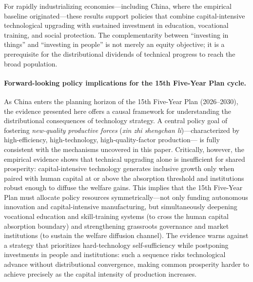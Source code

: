 \documentclass[12pt]{article}
\begin{document}
For rapidly industrializing economies---including China,
where the empirical baseline originated---these results
support policies that combine capital-intensive technological
upgrading with sustained investment in education, vocational
training, and social protection.
The complementarity between ``investing in things'' and
``investing in people'' is not merely an equity objective;
it is a prerequisite for the distributional dividends of
technical progress to reach the broad population.

\paragraph{Forward-looking policy implications for the 15th Five-Year
Plan cycle.}
As China enters the planning horizon of the 15th Five-Year Plan
(2026--2030), the evidence presented here offers a causal
framework for understanding the distributional consequences of
technology strategy.
A central policy goal of fostering \emph{new-quality productive
forces} (\textit{xin zhi shengchan li})---characterized by
high-efficiency, high-technology, high-quality-factor production---
is fully consistent with the mechanisms uncovered in this paper.
Critically, however, the empirical evidence shows that technical
upgrading alone is insufficient for shared prosperity:
capital-intensive technology generates inclusive growth only when
paired with human capital at or above the absorption threshold
and institutions robust enough to diffuse the welfare gains.
This implies that the 15th Five-Year Plan must allocate policy
resources symmetrically---not only funding autonomous innovation
and capital-intensive manufacturing, but simultaneously deepening
vocational education and skill-training systems (to cross the
human capital absorption boundary) and strengthening grassroots
governance and market institutions (to sustain the welfare
diffusion channel).
The evidence warns against a strategy that prioritizes
hard-technology self-sufficiency while postponing investments in
people and institutions: such a sequence risks technological
advance without distributional convergence, making common
prosperity harder to achieve precisely as the capital intensity
of production increases.

\clearpage

\end{document}
